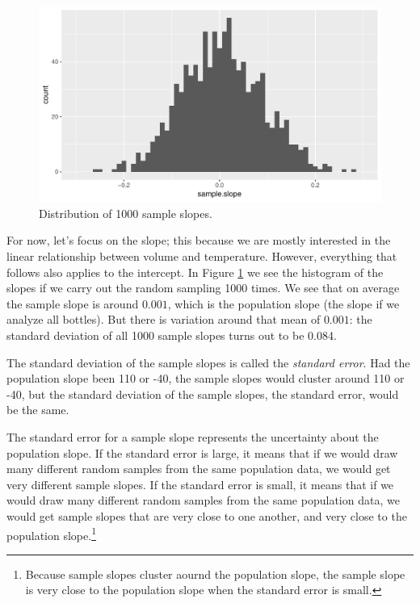 \documentclass[]{book}\usepackage[]{graphicx}\usepackage[]{color}
\makeatletter
\def\maxwidth{ %
  \ifdim\Gin@nat@width>\linewidth
    \linewidth
  \else
    \Gin@nat@width
  \fi
}
\newenvironment{knitrout}{}{} %
\makeatother
\begin{document}
\begin{knitrout}
\color{fgcolor}\begin{figure}

{\centering \includegraphics[width=\maxwidth]{figure/inf_5-1} 

}

\caption[Distribution of 1000 sample slopes]{Distribution of 1000 sample slopes.}\label{fig:inf_5}
\end{figure}


\end{knitrout}

For now, let's focus on the slope; this because we are mostly interested in the linear relationship between volume and temperature. However, everything that follows also applies to the intercept. In Figure \ref{fig:inf_5} we see the histogram of the slopes if we carry out the random sampling 1000 times. We see that on average the sample slope is around $0.001$, which is the population slope (the slope if we analyze all bottles). But there is variation around that mean of $0.001$: the standard deviation of all 1000 sample slopes turns out to be 0.084.


The standard deviation of the sample slopes is called the \textit{standard error}. Had the population slope been 110 or -40, the sample slopes would cluster around 110 or -40, but the standard deviation of the sample slopes, the standard error, would be the same.

The standard error for a sample slope represents the uncertainty about the population slope. If the standard error is large, it means that if we would draw many different random samples from the same population data, we would get very different sample slopes. If the standard error is small, it means that if we would draw many different random samples from the same population data, we would get sample slopes that are very close to one another, and very close to the population slope.\footnote{Because sample slopes cluster aournd the population slope, the sample slope is very close to the population slope when the standard error is small.}
\end{document}
